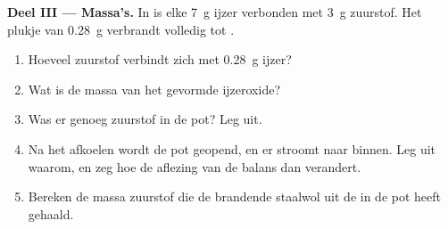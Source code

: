 \begin{problem}
\medskip
\noindent\textbf{Deel III --- Massa's.}
In  is elke \qty{7}{g} ijzer verbonden met \qty{3}{g}
zuurstof. Het plukje van \qty{0.28}{g} verbrandt volledig tot .
\begin{enumerate}[resume]
  \item Hoeveel zuurstof verbindt zich met \qty{0.28}{g} ijzer?
  \item Wat is de massa van het gevormde ijzeroxide?
  \item Was er genoeg zuurstof in de pot? Leg uit.
  \item Na het afkoelen wordt de pot geopend, en er stroomt  naar
        binnen. Leg uit waarom, en zeg hoe de aflezing van de balans dan
        verandert.
  \item Bereken de massa zuurstof die de brandende staalwol uit de 
        in de pot heeft gehaald.
\end{enumerate}
\end{problem}
